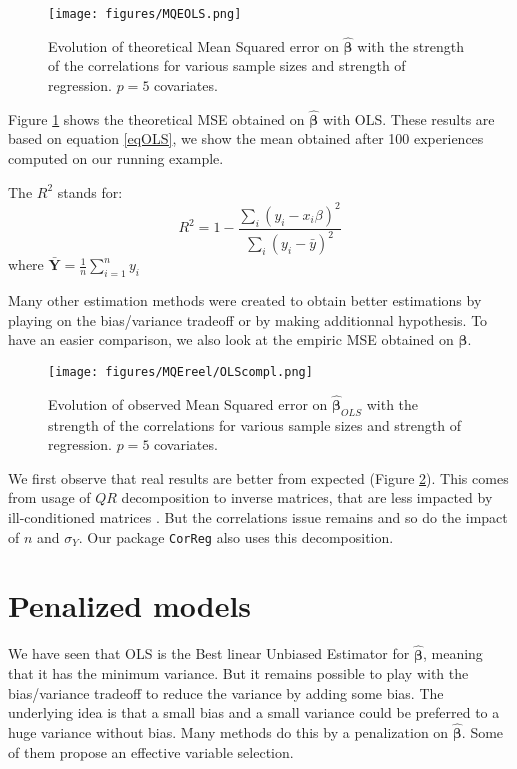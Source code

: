 \documentclass[12pt,a4paper]{report}
\begin{document}
	 \begin{figure}
	 \centering
	  \texttt{[image: figures/MQEOLS.png]}
	  \caption{Evolution of theoretical Mean Squared error on $\hat{\boldsymbol{\beta}}$ with the strength of the correlations for various sample sizes and strength of regression. $p=5$ covariates. } \label{MQEOLS1}
	\end{figure}
	
	Figure \ref{MQEOLS1} shows the theoretical MSE obtained on $\hat{\boldsymbol{\beta}}$ with OLS. These results are based on equation \ref{eqOLS}, we show the mean obtained after 100 experiences computed on our running example.
	
	The $R^2$ stands for:
	\begin{equation}\label{defR2}
	R^2=1-\frac{\sum_i (y_i - x_i\beta)^2}{\sum_i (y_i-\bar{y})^2}
	\end{equation}
	where $\bar{\boldsymbol{Y}}=\frac{1}{n}\sum_{i=1}^n y_i $
	
	
	Many other estimation methods were created to obtain better estimations by playing on the bias/variance tradeoff or by making additionnal hypothesis.
	To have an easier comparison, we also look at the empiric MSE obtained on $\hat{\boldsymbol{\beta}}$.
		
	
	
	 \begin{figure}
	 \centering
	  \texttt{[image: figures/MQEreel/OLScompl.png]}
	  \caption{Evolution of observed Mean Squared error on $\hat{\boldsymbol{\beta}}_{OLS}$ with the strength of the correlations for various sample sizes and strength of regression. $p=5$ covariates. } \label{MQEOLScompl}
	\end{figure}	
	We first observe that real results are better from expected (Figure \ref{MQEOLScompl}). This comes from usage of $QR$ decomposition to inverse matrices, that are less impacted by ill-conditioned matrices \cite{bulirsch2002introduction}. But the correlations issue remains and so do the impact of $n$ and $\sigma_Y$.  Our package {\tt CorReg} also uses this decomposition.
	\\
		 \FloatBarrier
		

	\section{Penalized models}
	
	We have seen that OLS is the Best linear Unbiased Estimator for $\hat{\boldsymbol{\beta}}$, meaning that it has the minimum variance. But it remains possible to play with the bias/variance tradeoff to reduce the variance by adding some bias. The underlying idea is that a small bias and a small variance could be preferred to a huge variance without bias. Many methods do this by a penalization on  $\hat{\boldsymbol{\beta}}$.  Some of them propose an effective variable selection.
\end{document}
